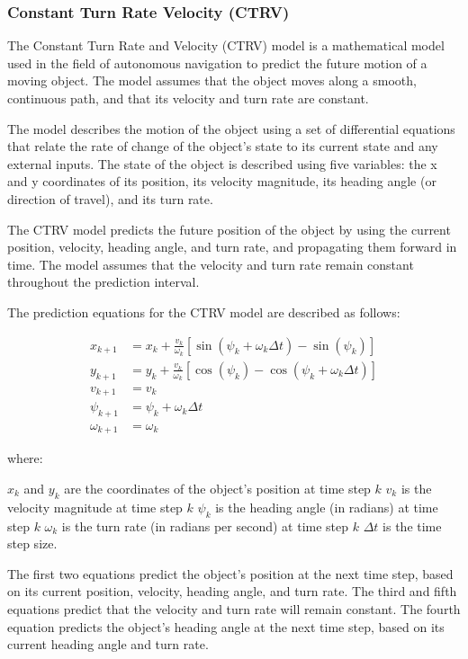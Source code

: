 \subsubsection{Constant Turn Rate Velocity (CTRV)}
\label{subsubsec:3_CTRV}

The Constant Turn Rate and Velocity (CTRV) model is a mathematical model used in the field of autonomous navigation to predict the future motion of a moving object. The model assumes that the object moves along a smooth, continuous path, and that its velocity and turn rate are constant.

The model describes the motion of the object using a set of differential equations that relate the rate of change of the object's state to its current state and any external inputs. The state of the object is described using five variables: the x and y coordinates of its position, its velocity magnitude, its heading angle (or direction of travel), and its turn rate.

The CTRV model predicts the future position of the object by using the current position, velocity, heading angle, and turn rate, and propagating them forward in time. The model assumes that the velocity and turn rate remain constant throughout the prediction interval.

The prediction equations for the CTRV model are described as follows:

\begin{equation}
\begin{split}
	x_{k+1} &= x_k + \frac{v_k}{\omega_k}\left[\sin(\psi_k+\omega_k\Delta t)-\sin(\psi_k)\right] \\
	y_{k+1} &= y_k + \frac{v_k}{\omega_k}\left[\cos(\psi_k)-\cos(\psi_k+\omega_k\Delta t)\right] \\
	v_{k+1} &= v_k \\
	\psi_{k+1} &= \psi_k + \omega_k\Delta t \\
	\omega_{k+1} &= \omega_k
\end{split}
\end{equation}
	
where:

$x_k$ and $y_k$ are the coordinates of the object's position at time step $k$
$v_k$ is the velocity magnitude at time step $k$
$\psi_k$ is the heading angle (in radians) at time step $k$
$\omega_k$ is the turn rate (in radians per second) at time step $k$
$\Delta t$ is the time step size.

The first two equations predict the object's position at the next time step, based on its current position, velocity, heading angle, and turn rate. The third and fifth equations predict that the velocity and turn rate will remain constant. The fourth equation predicts the object's heading angle at the next time step, based on its current heading angle and turn rate.

